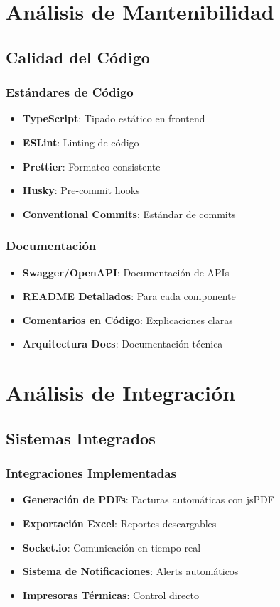 \documentclass[12pt,a4paper]{article}
\begin{document}
\section{Análisis de Mantenibilidad}

\subsection{Calidad del Código}

\subsubsection{Estándares de Código}
\begin{itemize}
    \item \textbf{TypeScript}: Tipado estático en frontend
    \item \textbf{ESLint}: Linting de código
    \item \textbf{Prettier}: Formateo consistente
    \item \textbf{Husky}: Pre-commit hooks
    \item \textbf{Conventional Commits}: Estándar de commits
\end{itemize}

\subsubsection{Documentación}
\begin{itemize}
    \item \textbf{Swagger/OpenAPI}: Documentación de APIs
    \item \textbf{README Detallados}: Para cada componente
    \item \textbf{Comentarios en Código}: Explicaciones claras
    \item \textbf{Arquitectura Docs}: Documentación técnica
\end{itemize}

\section{Análisis de Integración}

\subsection{Sistemas Integrados}

\subsubsection{Integraciones Implementadas}
\begin{itemize}
    \item \textbf{Generación de PDFs}: Facturas automáticas con jsPDF
    \item \textbf{Exportación Excel}: Reportes descargables
    \item \textbf{Socket.io}: Comunicación en tiempo real
    \item \textbf{Sistema de Notificaciones}: Alerts automáticos
    \item \textbf{Impresoras Térmicas}: Control directo
\end{itemize}
\end{document}
